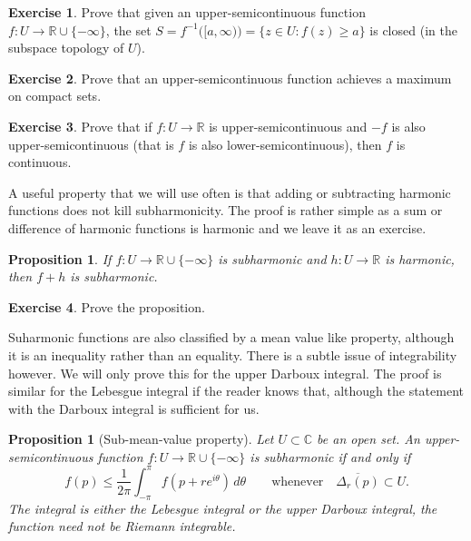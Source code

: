 \documentclass[12pt,openany]{book}
\newcommand{\C}{{\mathbb{C}}}
\newcommand{\R}{{\mathbb{R}}}
\theoremstyle{plain}
\newtheorem{prop}[thm]{Proposition}
\theoremstyle{remark}
\theoremstyle{definition}
\newenvironment{exbox}{%
    \def\FrameCommand{\vrule width 1pt \relax\hspace{10pt}}%
    \MakeFramed{\advance\hsize-\width\FrameRestore}%
}{%
    \endMakeFramed
}
\theoremstyle{exercise}
\newtheorem{exercise}{Exercise}[section]
\theoremstyle{example}
\begin{document}
\begin{exbox}
\begin{exercise}
Prove that given an upper-semicontinuous function $f \colon U \to \R \cup
\{-\infty\}$,
the set $S = f^{-1}\bigl([a,\infty)\bigr) = \{ z \in U : f(z) \geq a \}$
is closed (in the subspace topology of $U$).
\end{exercise}

\begin{exercise}
Prove that an upper-semicontinuous function achieves a maximum on compact sets.
\end{exercise}

\begin{exercise}
Prove that if $f \colon U \to \R$ is upper-semicontinuous and $-f$ is also
upper-semicontinuous (that is $f$ is also lower-semicontinuous), then $f$
is continuous.
\end{exercise}
\end{exbox}

A useful property that we will use often is that adding or subtracting 
harmonic functions does not kill subharmonicity.  The proof is rather simple
as a sum or difference of harmonic functions is harmonic and we leave it as
an exercise.

\begin{prop} \label{prop:fplushsubharmonic}
If $f \colon U \to \R \cup \{ - \infty \}$ is subharmonic and $h \colon U
\to \R$ is harmonic, then $f+h$ is subharmonic.
\end{prop}

\begin{exbox}
\begin{exercise}
Prove the proposition.
\end{exercise}
\end{exbox}

Suharmonic functions are also classified by a mean value like property,
although it is an inequality rather than an equality.  There is a subtle
issue of integrability however.
We will only prove this for the upper Darboux integral.
The proof is 
similar for the Lebesgue integral if the reader knows that, although
the statement with the Darboux integral is sufficient for us.

\begin{prop}[Sub-mean-value property]
\label{prop:submeanprop}
Let $U \subset \C$ be an open set.
An upper-semicontinuous function $f \colon U \to \R \cup \{ -\infty \}$
is subharmonic if and only if
\begin{equation*}
f(p) \leq \frac{1}{2\pi} \int_{-\pi}^{\pi} f(p+re^{i\theta})\, d\theta
\qquad \text{whenever} \quad
\overline{\Delta_r(p)} \subset U .
\end{equation*}
The integral is either the Lebesgue integral or the upper Darboux integral,
the function need not be Riemann integrable.
\end{prop}
\end{document}
